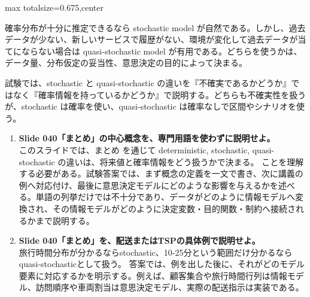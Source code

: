 \begin{adjustbox}{max totalsize={\textwidth}{0.675\textheight},center}
\begin{minipage}{\textwidth}
\begin{minipage}[t]{0.485\textwidth}
確率分布が十分に推定できるなら stochastic model が自然である。しかし、過去データが少ない、新しいサービスで履歴がない、環境が変化して過去データが当てにならない場合は quasi-stochastic model が有用である。どちらを使うかは、データ量、分布仮定の妥当性、意思決定の目的によって決まる。\par
試験では、stochastic と quasi-stochastic の違いを『不確実であるかどうか』ではなく『確率情報を持っているかどうか』で説明する。どちらも不確実性を扱うが、stochastic は確率を使い、quasi-stochastic は確率なしで区間やシナリオを使う。\par
{}
\begin{enumerate}
\item \textbf{Slide 040「まとめ」の中心概念を、専門用語を使わずに説明せよ。}\\このスライドでは、まとめ を通じて deterministic, stochastic, quasi-stochastic の違いは、将来値と確率情報をどう扱うかで決まる。 ことを理解する必要がある。試験答案では、まず概念の定義を一文で書き、次に講義の例へ対応付け、最後に意思決定モデルにどのような影響を与えるかを述べる。単語の列挙だけでは不十分であり、データがどのように情報モデルへ変換され、その情報モデルがどのように決定変数・目的関数・制約へ接続されるかまで説明する。
\item \textbf{Slide 040「まとめ」を、配送またはTSPの具体例で説明せよ。}\\旅行時間分布が分かるならstochastic、10-25分という範囲だけ分かるならquasi-stochasticとして扱う。 答案では、例を出した後に、それがどのモデル要素に対応するかを明示する。例えば、顧客集合や旅行時間行列は情報モデル、訪問順序や車両割当は意思決定モデル、実際の配送指示は実装である。
\end{enumerate}
\end{minipage}
\end{minipage}
\end{adjustbox}

